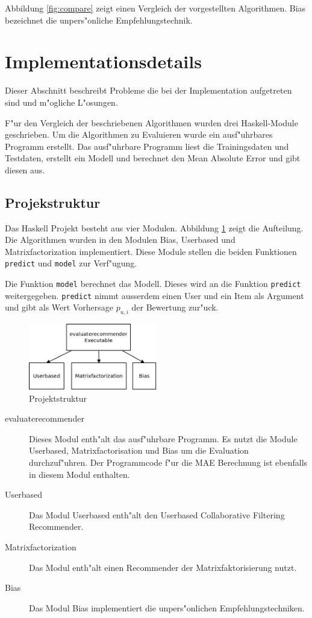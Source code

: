\documentclass[a4paper, 12pt]{article}
\begin{document}
Abbildung \ref{fig:compare} zeigt einen Vergleich der vorgestellten Algorithmen. Bias bezeichnet die unpers"onliche Empfehlungstechnik.

\section{Implementationsdetails}
\label{sec:ram}

Dieser Abschnitt beschreibt Probleme die bei der Implementation aufgetreten sind und m"ogliche L"osungen.

F"ur den Vergleich der beschriebenen Algorithmen wurden drei Haskell-Module geschrieben. Um die Algorithmen zu Evaluieren wurde ein ausf"uhrbares Programm erstellt. Das ausf"uhrbare Programm liest die Trainingsdaten und Testdaten, erstellt ein Modell und berechnet den Mean Absolute Error und gibt diesen aus.

\subsection{Projekstruktur}
\label{sec:structur}

Das Haskell Projekt besteht aus vier Modulen. Abbildung \ref{fig:structur} zeigt die Aufteilung. Die Algorithmen wurden in den Modulen Bias, Userbased und Matrixfactorization implementiert. Diese Module stellen die beiden Funktionen \verb|predict| und \verb|model| zur Verf"ugung.

Die Funktion \verb|model| berechnet das Modell. Dieses wird an die Funktion \verb|predict| weitergegeben. \verb|predict| nimmt ausserdem einen User und ein Item als Argument und gibt als Wert Vorhersage $p_{u,i}$ der Bewertung zur"uck.

\begin{figure}
  \centering
      \includegraphics[width=0.5\textwidth]{structur}
  \caption{Projektstruktur}
  \label{fig:structur}
\end{figure}

\begin{description}
\item[evaluaterecommender] Dieses Modul enth"alt das ausf"uhrbare Programm. Es nutzt die Module Userbased, Matrixfactorisation und Bias um die Evaluation durchzuf"uhren. Der Programmcode f"ur die MAE Berechnung ist ebenfalls in diesem Modul enthalten.
\item[Userbased] Das Modul Userbased enth"alt den Userbased Collaborative Filtering Recommender.
\item[Matrixfactorization] Das Modul enth"alt einen Recommender der Matrixfaktorisierung nutzt.
\item[Bias] Das Modul Bias implementiert die unpers"onlichen Empfehlungstechniken.
\end{description}
\end{document}
